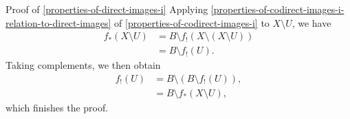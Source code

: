 \begin{Proof}{Proof of \cref{properties-of-direct-images-i}}
    Applying \cref{properties-of-codirect-images-i-relation-to-direct-images} of \cref{properties-of-codirect-images-i} to $X\setminus U$, we have
    \begin{align*}
        f_{*}(X\setminus U) &= B\setminus f_{!}(X\setminus(X\setminus U))\\
                            &= B\setminus f_{!}(U).
    \end{align*}
    Taking complements, we then obtain
    \begin{align*}
        f_{!}(U) &= B\setminus(B\setminus f_{!}(U)),\\
                 &= B\setminus f_{*}(X\setminus U),
    \end{align*}
    which finishes the proof.
\end{Proof}
